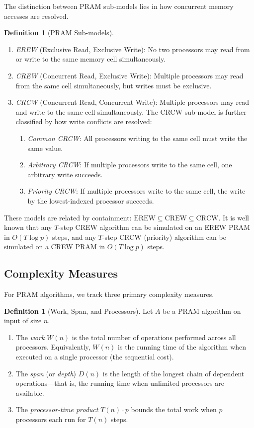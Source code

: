 \documentclass[twoside,12pt]{book}
\theoremstyle{plain}
\theoremstyle{definition}
\newtheorem{definition}[theorem]{Definition}
\theoremstyle{remark}
\begin{document}
The distinction between PRAM sub-models lies in how concurrent memory accesses are resolved.

\begin{definition}[PRAM Sub-models]
\label{def:pram-submodels}
\begin{enumerate}[label=(\roman*)]
\item \emph{EREW} (Exclusive Read, Exclusive Write): No two processors may read from or write to the same memory cell simultaneously.
\item \emph{CREW} (Concurrent Read, Exclusive Write): Multiple processors may read from the same cell simultaneously, but writes must be exclusive.
\item \emph{CRCW} (Concurrent Read, Concurrent Write): Multiple processors may read and write to the same cell simultaneously. The CRCW sub-model is further classified by how write conflicts are resolved:
\begin{enumerate}[label=(\alph*)]
\item \emph{Common CRCW}: All processors writing to the same cell must write the same value.
\item \emph{Arbitrary CRCW}: If multiple processors write to the same cell, one arbitrary write succeeds.
\item \emph{Priority CRCW}: If multiple processors write to the same cell, the write by the lowest-indexed processor succeeds.
\end{enumerate}
\end{enumerate}
\end{definition}

These models are related by containment: $\text{EREW} \subseteq \text{CREW} \subseteq \text{CRCW}$. It is well known that any $T$-step CREW algorithm can be simulated on an EREW PRAM in $O(T \log p)$ steps, and any $T$-step CRCW (priority) algorithm can be simulated on a CREW PRAM in $O(T \log p)$ steps.

\subsection{Complexity Measures}
\label{subsec:complexity-measures}

For PRAM algorithms, we track three primary complexity measures.

\begin{definition}[Work, Span, and Processors]
\label{def:work-span}
Let $A$ be a PRAM algorithm on input of size $n$.
\begin{enumerate}[label=(\roman*)]
\item The \emph{work} $W(n)$ is the total number of operations performed across all processors. Equivalently, $W(n)$ is the running time of the algorithm when executed on a single processor (the sequential cost).
\item The \emph{span} (or \emph{depth}) $D(n)$ is the length of the longest chain of dependent operations---that is, the running time when unlimited processors are available.
\item The \emph{processor-time product} $T(n) \cdot p$ bounds the total work when $p$ processors each run for $T(n)$ steps.
\end{enumerate}
\end{definition}
\end{document}
